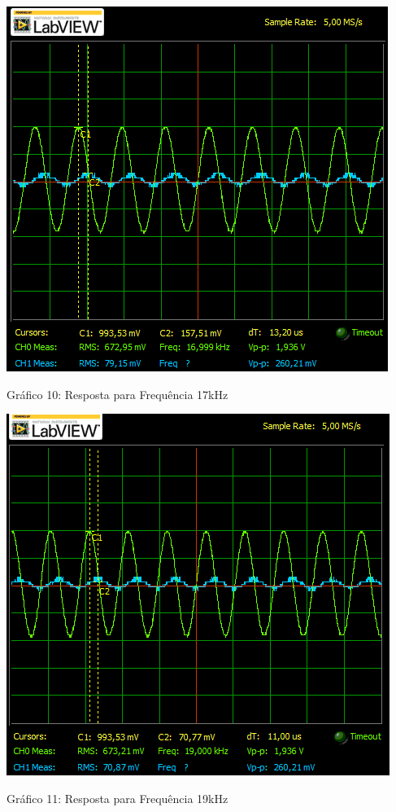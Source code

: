\newpage
\begin{table}[h]
\centering
\includegraphics[scale=0.7]{graficos/RGADICOA17}
\end{table}
\begin{center}
Gráfico 10: Resposta para Frequência 17kHz
\end{center}


\begin{table}[h]
\centering
\includegraphics[scale=0.7]{graficos/RGADICOA19}
\end{table}
\begin{center}
Gráfico 11: Resposta para Frequência 19kHz
\end{center}